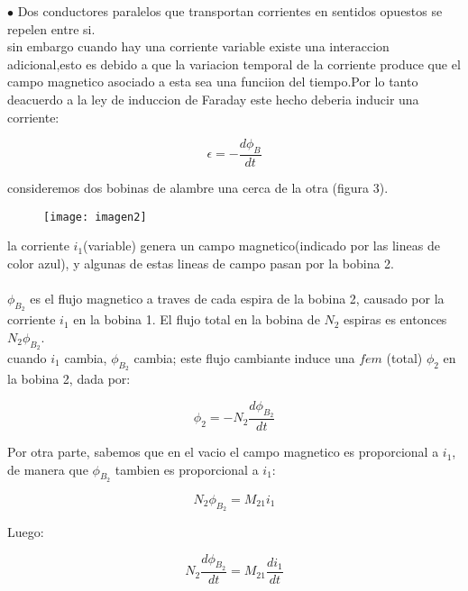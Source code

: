 \documentclass[13pt,twoside]{article}
\begin{document}
$\bullet$ Dos conductores paralelos que transportan corrientes en sentidos opuestos se repelen entre si.\\

sin embargo cuando hay una corriente variable existe una interaccion adicional,esto es debido a que la variacion temporal de la corriente produce que el campo magnetico asociado a esta sea una funciion del tiempo.Por lo tanto deacuerdo a la ley de induccion de Faraday este hecho deberia inducir una corriente:

\begin{equation}
\displaystyle\epsilon=-\frac{d\phi_{B}}{dt}
\end{equation}

consideremos dos bobinas de alambre una cerca de la otra (figura 3).\\

\begin{figure}[htb]
 \centering
   \texttt{[image: imagen2]}
  \caption{}
  \label{} 
\end{figure}

la corriente $i_{1}$(variable) genera un campo magnetico(indicado por las lineas de color azul), y algunas de estas lineas de campo pasan por la bobina 2.\\
\\
$\phi_{B_{2}}$ es el flujo magnetico a traves de cada espira de la bobina 2, causado por la corriente $i_{1}$ en la bobina 1. El flujo total en la bobina de $N_{2}$ espiras es entonces $N_{2}\phi_{B_{2}}$.\\


cuando $i_{1}$ cambia, $\phi_{B_{2}}$ cambia; este flujo cambiante induce una $fem$ (total) $\phi_{2}$ en la bobina 2, dada por:

\begin{equation}
\displaystyle\phi_{2}=-N_{2}\frac{d\phi_{B_{2}}}{dt}
\end{equation}

Por otra parte, sabemos que en el vacio el campo magnetico es proporcional a $i_{1}$, de manera que $\phi_{B_{2}}$ tambien es proporcional a $i_{1}$:

\begin{equation}
N_{2}\phi_{B_{2}}=M_{21}i_{1}
\end{equation}

Luego:

\begin{equation}
N_{2}\frac{d\phi_{B_{2}}}{dt}=M_{21}\frac{di_{1}}{dt}
\end{equation}
\end{document}
